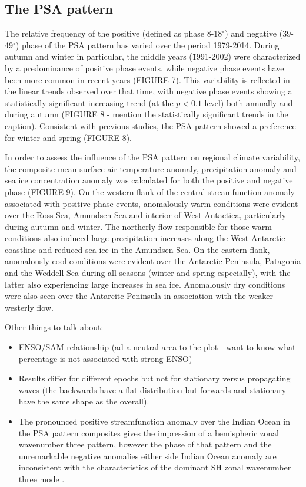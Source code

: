 \subsection{The PSA pattern}

The relative frequency of the positive (defined as phase 8-18$^{\circ}$) and negative (39-49$^{\circ}$) phase of the PSA pattern has varied over the period 1979-2014. During autumn and winter in particular, the middle years (\~1991-2002) were characterized by a predominance of positive phase events, while negative phase events have been more common in recent years (FIGURE 7). This variability is reflected in the linear trends observed over that time, with negative phase events showing a statistically significant increasing trend (at the $p < 0.1$ level) both annually and during autumn (FIGURE 8 - mention the statistically significant trends in the caption). Consistent with previous studies, the PSA-pattern showed a preference for winter and spring (FIGURE 8).

In order to assess the influence of the PSA pattern on regional climate variability, the composite mean surface air temperature anomaly, precipitation anomaly and sea ice concentration anomaly was calculated for both the positive and negative phase (FIGURE 9). On the western flank of the central streamfunction anomaly associated with positive phase events, anomalously warm conditions were evident over the Ross Sea, Amundsen Sea and interior of West Antactica, particularly during autumn and winter. The northerly flow responsible for those warm conditions also induced large precipitation increases along the West Antarctic coastline and reduced sea ice in the Amundsen Sea. On the eastern flank, anomalously cool conditions were evident over the Antarctic Peninsula, Patagonia and the Weddell Sea during all seasons (winter and spring especially), with the latter also experiencing large increases in sea ice. Anomalously dry conditions were also seen over the Antarcitc Peninsula in association with the weaker westerly flow. 

Other things to talk about:
\begin{itemize}
\item ENSO/SAM relationship (ad a neutral area to the plot - want to know what percentage is not associated with strong ENSO)
\item Results differ for different epochs but not for stationary versus propagating waves (the backwards have a flat distribution but forwards and stationary have the same shape as the overall).
\item The pronounced positive streamfunction anomaly over the Indian Ocean in the PSA pattern composites gives the impression of a hemispheric zonal wavenumber three pattern, however the phase of that pattern and the unremarkable negative anomalies either side Indian Ocean anomaly are inconsistent with the characteristics of the dominant SH zonal wavenumber three mode \citep[e.g.][]{Raphael2004,IrvingSimmonds2015}.
\end{itemize}


